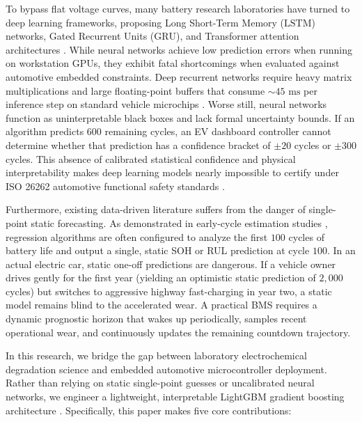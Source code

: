 \documentclass[journal,10pt]{IEEEtran}
\begin{document}
To bypass flat voltage curves, many battery research laboratories have turned to deep learning frameworks, proposing Long Short-Term Memory ($\text{LSTM}$) networks, Gated Recurrent Units ($\text{GRU}$), and Transformer attention architectures \cite{hu2021state, greenbank2021transfer}. While neural networks achieve low prediction errors when running on workstation GPUs, they exhibit fatal shortcomings when evaluated against automotive embedded constraints. Deep recurrent networks require heavy matrix multiplications and large floating-point buffers that consume $\sim 45\text{ ms}$ per inference step on standard vehicle microchips \cite{li2024embedded}. Worse still, neural networks function as uninterpretable black boxes and lack formal uncertainty bounds. If an algorithm predicts $600$ remaining cycles, an EV dashboard controller cannot determine whether that prediction has a confidence bracket of $\pm 20$ cycles or $\pm 300$ cycles. This absence of calibrated statistical confidence and physical interpretability makes deep learning models nearly impossible to certify under ISO 26262 automotive functional safety standards \cite{iso26262, lin2023physics}.

Furthermore, existing data-driven literature suffers from the danger of single-point static forecasting. As demonstrated in early-cycle estimation studies \cite{severson2019data, attia2020closed}, regression algorithms are often configured to analyze the first $100$ cycles of battery life and output a single, static SOH or RUL prediction at cycle $100$. In an actual electric car, static one-off predictions are dangerous. If a vehicle owner drives gently for the first year (yielding an optimistic static prediction of $2,000$ cycles) but switches to aggressive highway fast-charging in year two, a static model remains blind to the accelerated wear. A practical BMS requires a dynamic prognostic horizon that wakes up periodically, samples recent operational wear, and continuously updates the remaining countdown trajectory.

In this research, we bridge the gap between laboratory electrochemical degradation science and embedded automotive microcontroller deployment. Rather than relying on static single-point guesses or uncalibrated neural networks, we engineer a lightweight, interpretable LightGBM gradient boosting architecture \cite{ke2017lightgbm, yang2021remaining}. Specifically, this paper makes five core contributions:
\end{document}
